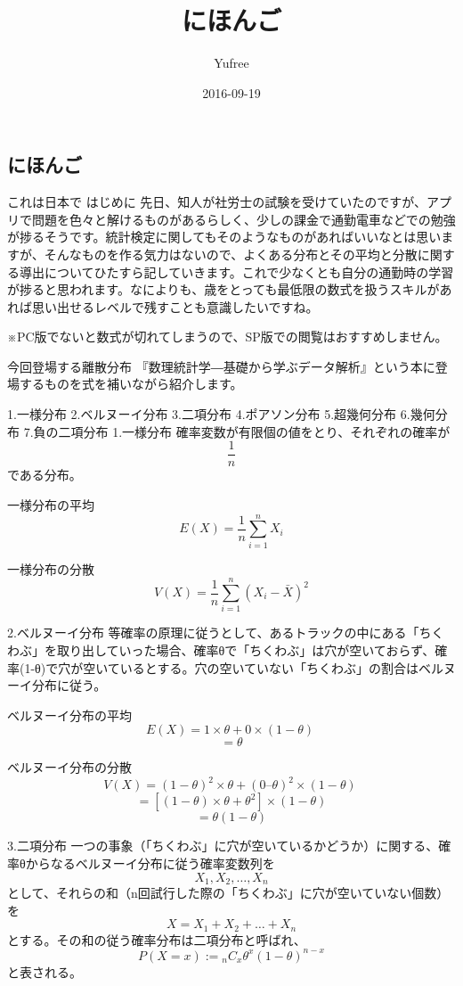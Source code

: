 \documentclass[]{article}
\title{にほんご}
\author{Yufree}
\date{2016-09-19}
\begin{document}
\maketitle

\subsection{にほんご}

これは日本で はじめに
先日、知人が社労士の試験を受けていたのですが、アプリで問題を色々と解けるものがあるらしく、少しの課金で通勤電車などでの勉強が捗るそうです。統計検定に関してもそのようなものがあればいいなとは思いますが、そんなものを作る気力はないので、よくある分布とその平均と分散に関する導出についてひたすら記していきます。これで少なくとも自分の通勤時の学習が捗ると思われます。なによりも、歳をとっても最低限の数式を扱うスキルがあれば思い出せるレベルで残すことも意識したいですね。

※PC版でないと数式が切れてしまうので、SP版での閲覧はおすすめしません。

今回登場する離散分布
『数理統計学―基礎から学ぶデータ解析』という本に登場するものを式を補いながら紹介します。

1.一様分布 2.ベルヌーイ分布 3.二項分布 4.ポアソン分布 5.超幾何分布
6.幾何分布 7.負の二項分布 1.一様分布
確率変数が有限個の値をとり、それぞれの確率が\[\frac{1}{n}\]である分布。

一様分布の平均 \[E(X)=\frac{1}{n}\sum_{i=1}^{n}X_{i}\]

一様分布の分散 \[V(X)=\frac{1}{n}\sum_{i=1}^{n}(X_{i}-\bar X)^2\]

2.ベルヌーイ分布
等確率の原理に従うとして、あるトラックの中にある「ちくわぶ」を取り出していった場合、確率θで「ちくわぶ」は穴が空いておらず、確率(1-θ)で穴が空いているとする。穴の空いていない「ちくわぶ」の割合はベルヌーイ分布に従う。

ベルヌーイ分布の平均 \[E(X)=1 \times \theta + 0 \times (1-\theta ) \ \]
\[ = \theta \]

ベルヌーイ分布の分散
\[V(X)=(1-\theta)^2 \times \theta + (0 – \theta)^2 \times (1-\theta ) \ \]
\[ = \left[ (1-\theta) \times \theta + \theta^2 \right] \times (1-\theta) \]
\[ = \theta(1-\theta) \]

3.二項分布
一つの事象（「ちくわぶ」に穴が空いているかどうか）に関する、確率θからなるベルヌーイ分布に従う確率変数列を
\[X_1 , X_2, \dots ,X_n\]
として、それらの和（n回試行した際の「ちくわぶ」に穴が空いていない個数）を
\[X = X_1 + X_2 + \dots + X_n\]
とする。その和の従う確率分布は二項分布と呼ばれ、
\[P(X=x):= {}_n C_x \theta^x(1-\theta)^{n-x}\] と表される。
\end{document}

